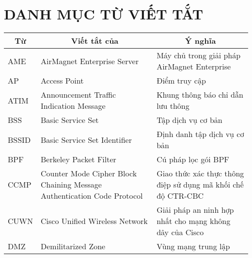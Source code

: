 \chapter*{DANH MỤC TỪ VIẾT TẮT}

\begin{table}[H]
\centering
\small
\setlength{\extrarowheight}{1pt}
\begin{tabular}{|l|p{6cm}|p{7cm}|}
\hline
\multicolumn{1}{|c|}{\textbf{Từ}} & \multicolumn{1}{c|}{\textbf{Viết tắt của}}                              & \multicolumn{1}{c|}{\textbf{Ý nghĩa}}                        \\ \hline
AME                               & AirMagnet Enterprise Server                                             & Máy chủ trong giải pháp AirMagnet Enterprise                 \\ \hline
AP                                & Access Point                                                            & Điểm truy cập                                                \\ \hline
ATIM                              & Announcement Traffic Indication Message                                 & Khung thông báo chỉ dẫn lưu thông                            \\ \hline
BSS                               & Basic Service Set                                                       & Tập dịch vụ cơ bản                                           \\ \hline
BSSID                             & Basic Service Set Identifier                                            & Định danh tập dịch vụ cơ bản                                 \\ \hline
BPF                               & Berkeley Packet Filter                                                  & Cú pháp lọc gói BPF                                          \\ \hline
CCMP                              & Counter Mode Cipher Block Chaining Message Authentication Code Protocol & Giao thức xác thực thông điệp sử dụng mã khối chế độ CTR-CBC \\ \hline
CUWN                              & Cisco Unified Wireless Network                                          & Giải pháp an ninh hợp nhất cho mạng không dây của Cisco      \\ \hline
DMZ                               & Demilitarized Zone                                                      & Vùng mạng trung lập                                          \\ \hline

\end{tabular}
\end{table}
